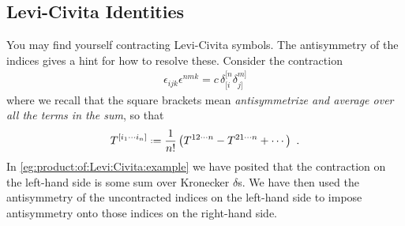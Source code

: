 \documentclass[12pt, oneside]{report}    %
\let\oldsection\section
\def\section{%
  \setcounter{sidenote}{1}%
  \oldsection
}
\begin{document}
\begin{subappendices}
\section{Levi-Civita Identities}

You may find yourself contracting Levi-Civita symbols. The antisymmetry of the indices gives a hint for how to resolve these. Consider the contraction
\begin{align}
\epsilon_{ijk}\epsilon^{nmk}
= c \, \delta^{[n}_{[i}\delta^{m]}_{j]}    
\label{eg:product:of:Levi:Civita:example}
\end{align}
where we recall that the square brackets mean \emph{antisymmetrize and average over all the terms in the sum}, so that 
\begin{align}
    T^{[i_1\cdots i_n]} \defeq \frac{1}{n!}
    \left(  
        T^{12\cdots n}
        - T^{21\cdots n}
        + \cdots
    \right) \ .
\end{align}
In \eqref{eg:product:of:Levi:Civita:example} we have posited that the contraction on the left-hand side is some sum over Kronecker $\delta$s. We have then used the antisymmetry of the uncontracted indices on the left-hand side to impose antisymmetry onto those indices on the right-hand side. 


\end{subappendices}
\end{document}
